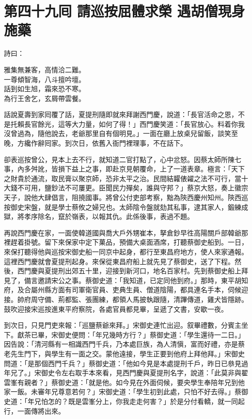
\chapter*{第四十九囘 請巡按屈體求榮 遇胡僧現身施藥}


詩曰：

\begin{myquote} 
雅集無兼客，高情洽二難。\\一尊傾智海，八斗擅吟壇。\\話到如生旭，霜來恐不寒。\\為行王舍乞，玄屑帶雲餐。
\end{myquote} 

話說夏壽到家囘覆了話，夏提刑隨即就來拜謝西門慶，說道：「長官活命之恩，不是托賴長官餘光，這等大力量，如何了得！」西門慶笑道：「長官放心。料着你我沒曾過為，隨他說去，老爺那里自有個明見。」一面在廳上放桌兒留飯，談笑至晚，方纔作辭囘家。到次日，依舊入衙門裡理事，不在話下。

卻表巡按曾公，見本上去不行，就知道二官打點了，心中忿怒。因蔡太師所陳七事，內多舛訛，皆損下益上之事，即赴京見朝覆命，上了一道表章。極言：「天下之財貴於通流，取民膏以聚京師，恐非太平之治。民間結糶俵糴之法不可行，當十大錢不可用，鹽鈔法不可屢更。臣聞民力殫矣，誰與守邦？」蔡京大怒，奏上徽宗天子，說他大肆倡言，阻撓國事。將曾公付吏部考察，黜為陝西慶州知州。陝西巡按御史宋盤，就是學士蔡攸之婦兄也。太師陰令盤就劾其私事，逮其家人，鍛練成獄，將孝序除名，竄於嶺表，以報其仇。此係後事，表過不題。

再說西門慶在家，一面使韓道國與喬大戶外甥崔本，拏倉鈔早徃高陽關戶部韓爺那裡趕着掛號。留下來保家中定下菓品，預備大桌面酒席，打聽蔡御史船到。一日，來保打聽得他與巡按宋御史船一同京中起身，都行至東昌府地方，使人來家通報。這裡西門慶就會夏提刑起身。來保從東昌府船上就先見了蔡御史，送了下程。然後，西門慶與夏提刑出郊五十里，迎接到新河口，地名百家村。先到蔡御史船上拜見了，備言邀請宋公之事。蔡御史道：「我知道，已定同他到府。」那時，東平胡知府，及合屬州縣方面有司軍衛官員、吏典生員、僧道陰陽，都具連名手本，伺候迎接。帥府周守備、荊都監、張團練，都領人馬披執跟隨，清蹕傳道，雞犬皆隱跡。鼓吹迎接宋巡按進東平府察院，各處官員都見畢，呈遞了文書，安歇一夜。

到次日，只見門吏來報：「巡鹽蔡爺來拜。」宋御史連忙出迎。叙畢禮數，分賓主坐下。獻茶已畢，宋御史便問：「年兄幾時方行？」蔡御史道：「學生還待一二日。」因告說：「清河縣有一相識西門千兵，乃本處巨族，為人清愼，富而好禮，亦是蔡老先生門下，與學生有一面之交。蒙他遠接，學生正要到他府上拜他拜。」宋御史問道：「是那個西門千兵？」蔡御史道：「他如今見是本處提刑千戶，昨日已叅見過年兄了。」宋御史令左右取手本來看，見西門慶與夏提刑名字，說道：「此莫非與翟雲峯有親者？」蔡御史道：「就是他。如今見在外面伺候，要央學生奉陪年兄到他家一飯。未審年兄尊意若何？」宋御史道：「學生初到此處，只怕不好去得。」蔡御史道：「年兄怕怎的？既是雲峯分上，你我走走何害？」{}於是分付看轎，就一同起行，一面傳將出來。

